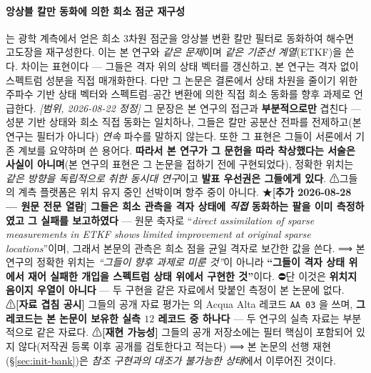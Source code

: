 \documentclass[11pt]{report}
\numberwithin{equation}{chapter}
\numberwithin{figure}{chapter}
\numberwithin{table}{chapter}
\begin{document}
\paragraph{앙상블 칼만 동화에 의한 희소 점군 재구성}
\citet{Wang2025PointsToWaves}는 광학 계측에서 얻은 희소 3차원 점군을 앙상블 변환 칼만
필터로 동화하여 해수면 고도장을 재구성한다. 이는 본 연구와 \emph{같은 문제}이며
\emph{같은 기준선 계열}(ETKF)을 쓴다. 차이는 표현이다 --- 그들은 격자 위의 상태 벡터를
갱신하고, 본 연구는 격자 없이 스펙트럼 성분을 직접 매개화한다. 다만 그 논문은 결론에서 상태 차원을 줄이기 위한 주파수 기반 상태 벡터와
스펙트럼--공간 변환에 의한 직접 희소 동화를 향후 과제로 언급한다.
\emph{[범위, 2026-08-22 정정]} 그 문장은 본 연구의 접근과 \textbf{부분적으로만} 겹친다 ---
성분 기반 상태와 희소 직접 동화는 일치하나, 그들은 칼만 공분산 전파를 전제하고(본 연구는
필터가 아니다) \emph{연속} 파수를 말하지 않는다. 또한 그 표현은 그들이 서론에서 기존
계보를 요약하며 쓴 용어다. \textbf{따라서 본 연구가 그 문헌을 따라 착상했다는 서술은
사실이 아니며}(본 연구의 표현은 그 논문을 접하기 전에 구현되었다), 정확한 위치는
\emph{같은 방향을 독립적으로 취한 동시대 연구}이고 \textbf{발표 우선권은 그들에게 있다}.
⚠그들의 계측 플랫폼은 위치 유지 중인 선박이며 항주 중이 아니다.
★\textbf{[추가 2026-08-28 --- 원문 전문 열람] 그들은 희소 관측을 격자 상태에 \emph{직접}
동화하는 팔을 이미 측정하였고 그 실패를 보고하였다} --- 원문 축자로 ``\emph{direct
assimilation of sparse measurements in ETKF shows limited improvement at original sparse
locations}''이며, 그래서 본문의 관측은 희소 점을 균일 격자로 보간한 값을 쓴다.
⟹ 본 연구의 정확한 위치는 \emph{``그들이 향후 과제로 미룬 것''}이 아니라
\textbf{``그들이 격자 상태 위에서 재어 실패한 개입을 스펙트럼 상태 위에서 구현한 것''}이다.
⛔단 이것은 \textbf{위치지음이지 우열이 아니다} --- 두 구현을 같은 자료에서 맞붙인 측정이
본 논문에 없다.
⚠\textbf{[자료 겹침 공시]} 그들의 공개 자료 평가는 \citet{Guimaraes2020Dataset} 의
Acqua Alta 레코드 \texttt{AA 03} 을 쓰며, \textbf{그 레코드는 본 논문이 보유한 실측
$12$ 레코드 중 하나다} --- 두 연구의 실측 자료는 부분적으로 같은 자료다.
⚠\textbf{[재현 가능성]} 그들의 공개 저장소에는 필터 핵심이 포함되어 있지 않다(저작권
등록 이후 공개를 검토한다고 적는다) ⟹ 본 논문의 선행 재현(\S\ref{sec:init-bank})은
\emph{참조 구현과의 대조가 불가능한 상태}에서 이루어진 것이다.
\end{document}
